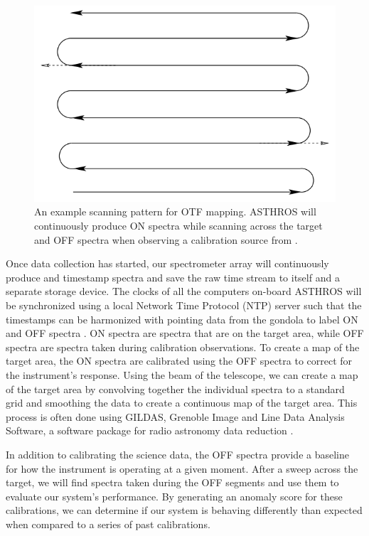 \begin{figure}
    \centering
    \includegraphics[width=0.5\linewidth]{figs/spectra/scan.png}
    \caption[On-the-Fly Mapping Scanning Pattern Demonstrating On and Off Observations]{An example scanning pattern for OTF mapping. ASTHROS will continuously produce ON spectra while scanning across the target and OFF spectra when observing a calibration source from \parencite{mangum2007fly}.}
    \label{spectra/fig:scan}
\end{figure}

Once data collection has started, our spectrometer array will continuously produce and timestamp spectra and save the raw time stream to itself and a separate storage device. 
The clocks of all the computers on-board ASTHROS will be synchronized using a local Network Time Protocol (NTP) server such that the timestamps can be harmonized with pointing data from the gondola to label ON and OFF spectra \parencite{mills1991internet}.
ON spectra are spectra that are on the target area, while OFF spectra are spectra taken during calibration observations.
To create a map of the target area, the ON spectra are calibrated using the OFF spectra to correct for the instrument's response.
Using the beam of the telescope, we can create a map of the target area by convolving together the individual spectra to a standard grid and smoothing the data to create a continuous map of the target area.
This process is often done using GILDAS, Grenoble Image and Line Data Analysis Software, a software package for radio astronomy data reduction \parencite{team2013gildas}.

In addition to calibrating the science data, the OFF spectra provide a baseline for how the instrument is operating at a given moment.
After a sweep across the target, we will find spectra taken during the OFF segments and use them to evaluate our system's performance.
By generating an anomaly score for these calibrations, we can determine if our system is behaving differently than expected when compared to a series of past calibrations.

